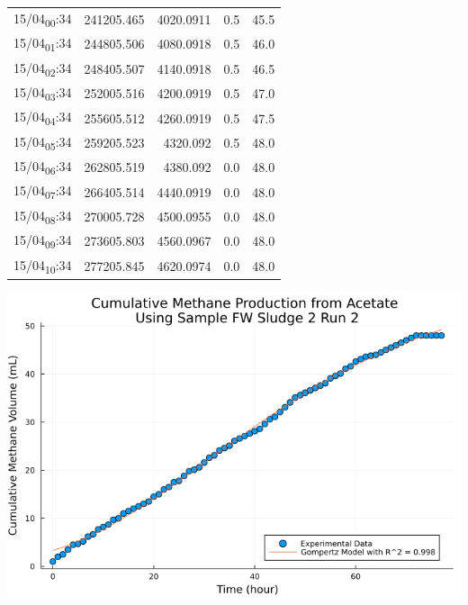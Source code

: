 \documentclass[11pt]{article}
\begin{document}
\begin{center}
\begin{tabular}{lrrrr}
15/04\textsubscript{00}:34 & 241205.465 & 4020.0911 & 0.5 & 45.5\\[0pt]
15/04\textsubscript{01}:34 & 244805.506 & 4080.0918 & 0.5 & 46.0\\[0pt]
15/04\textsubscript{02}:34 & 248405.507 & 4140.0918 & 0.5 & 46.5\\[0pt]
15/04\textsubscript{03}:34 & 252005.516 & 4200.0919 & 0.5 & 47.0\\[0pt]
15/04\textsubscript{04}:34 & 255605.512 & 4260.0919 & 0.5 & 47.5\\[0pt]
15/04\textsubscript{05}:34 & 259205.523 & 4320.092 & 0.5 & 48.0\\[0pt]
15/04\textsubscript{06}:34 & 262805.519 & 4380.092 & 0.0 & 48.0\\[0pt]
15/04\textsubscript{07}:34 & 266405.514 & 4440.0919 & 0.0 & 48.0\\[0pt]
15/04\textsubscript{08}:34 & 270005.728 & 4500.0955 & 0.0 & 48.0\\[0pt]
15/04\textsubscript{09}:34 & 273605.803 & 4560.0967 & 0.0 & 48.0\\[0pt]
15/04\textsubscript{10}:34 & 277205.845 & 4620.0974 & 0.0 & 48.0\\[0pt]
\end{tabular}
\end{center}

\begin{center}
\includegraphics[width=.9\linewidth]{../plots/BMPs/Acetate/methane_kinetics_acet_test_fw_s2_2_hour.png}
\end{center}
\end{document}
